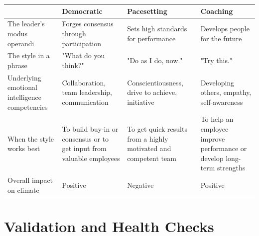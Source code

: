 \begin{table}[htbp]
  \centering
  \small
  \begin{tabular}{>{\raggedright\arraybackslash}p{4cm} >{\raggedright\arraybackslash}p{4.5cm} >{\raggedright\arraybackslash}p{4.5cm} >{\raggedright\arraybackslash}p{4.5cm}}
    \midrule
     & \textbf{Democratic} & \textbf{Pacesetting} & \textbf{Coaching} \\
    \midrule
    The leader's modus operandi & Forges consensus through participation & Sets high standards for performance & Develops people for the future \\
    \midrule
    The style in a phrase & "What do you think?" & "Do as I do, now." & "Try this." \\
    \midrule
    Underlying emotional intelligence competencies & Collaboration, team leadership, communication & Conscientiousness, drive to achieve, initiative & Developing others, empathy, self-awareness \\
    \midrule
    When the style works best & To build buy-in or consensus or to get input from valuable employees & To get quick results from a highly motivated and competent team & To help an employee improve performance or develop long-term strengths \\
    \midrule
    Overall impact on climate & Positive & Negative & Positive \\
    \bottomrule
  \end{tabular}
\end{table}

\clearpage
\section{Validation and Health Checks}

